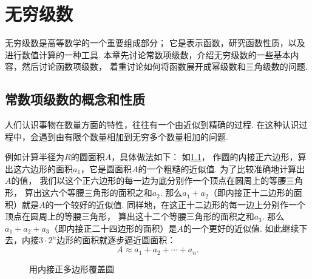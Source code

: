 \begingroup
\def\s{\sum\limits_{i=1}^\infty }
\renewcommand{\s}[1][1]{\sum\limits_{i=#1}^\infty}%
\def\l{\lim\limits_{n\to\infty}}
\def\tint{\int_{-\pi}^{\pi}}

\chapter{无穷级数}
无穷级数是高等数学的一个重要组成部分；
它是表示函数，研究函数性质，以及进行数值计算的一种工具.
本章先讨论常数项级数，介绍无穷级数的一些基本内容，然后讨论函数项级数，
着重讨论如何将函数展开成幂级数和三角级数的问题.

\section{常数项级数的概念和性质}
人们认识事物在数量方面的特性，往往有一个由近似到精确的过程.
在这种认识过程中，会遇到由有限个数量相加到无穷多个数量相加的问题.

例如计算半径为\(R\)的圆面积\(A\)，具体做法如下：
如\cref{figure:无穷级数.用内接正多边形覆盖圆}，
作圆的内接正六边形，算出这六边形的面积\(a_1\)，它是圆面积\(A\)的一个粗糙的近似值.
为了比较准确地计算出\(A\)的值，
我们以这个正六边形的每一边为底分别作一个顶点在圆周上的等腰三角形，
算出这六个等腰三角形的面积之和\(a_2\).
那么\(a_1+a_2\)（即内接正十二边形的面积）就是\(A\)的一个较好的近似值.
同样地，在这正十二边形的每一边上分别作一个顶点在圆周上的等腰三角形，
算出这十二个等腰三角形的面积之和\(a_3\).
那么\(a_1+a_2+a_3\)（即内接正二十四边形的面积）是\(A\)的一个更好的近似值.
如此继续下去，内接\(3\cdot2^n\)边形的面积就逐步逼近圆面积：\[
	A \approx a_1 + a_2 + \dotsb + a_n.
\]

\begin{figure}[h]
	\centering
	\caption{用内接正多边形覆盖圆}
	\label{figure:无穷级数.用内接正多边形覆盖圆}
\end{figure}

